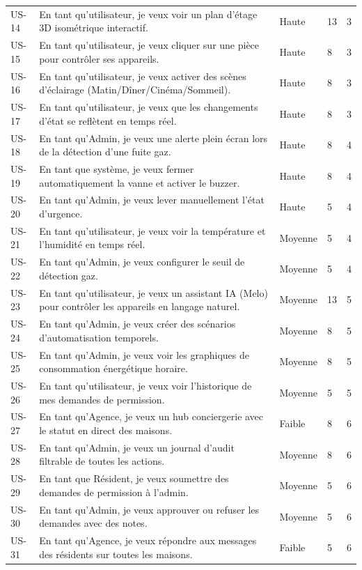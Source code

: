 \begin{center}
\begin{longtable}{p{} p{} p{} p{} p{}}
US-14 & En tant qu'utilisateur, je veux voir un plan d'étage 3D isométrique interactif. & Haute & 13 & 3 \\
US-15 & En tant qu'utilisateur, je veux cliquer sur une pièce pour contrôler ses appareils. & Haute & 8 & 3 \\
US-16 & En tant qu'utilisateur, je veux activer des scènes d'éclairage (Matin/Dîner/Cinéma/Sommeil). & Haute & 8 & 3 \\
US-17 & En tant qu'utilisateur, je veux que les changements d'état se reflètent en temps réel. & Haute & 8 & 3 \\
US-18 & En tant qu'Admin, je veux une alerte plein écran lors de la détection d'une fuite gaz. & Haute & 8 & 4 \\
US-19 & En tant que système, je veux fermer automatiquement la vanne et activer le buzzer. & Haute & 8 & 4 \\
US-20 & En tant qu'Admin, je veux lever manuellement l'état d'urgence. & Haute & 5 & 4 \\
US-21 & En tant qu'utilisateur, je veux voir la température et l'humidité en temps réel. & Moyenne & 5 & 4 \\
US-22 & En tant qu'Admin, je veux configurer le seuil de détection gaz. & Moyenne & 5 & 4 \\
US-23 & En tant qu'utilisateur, je veux un assistant IA (Melo) pour contrôler les appareils en langage naturel. & Moyenne & 13 & 5 \\
US-24 & En tant qu'Admin, je veux créer des scénarios d'automatisation temporels. & Moyenne & 8 & 5 \\
US-25 & En tant qu'Admin, je veux voir les graphiques de consommation énergétique horaire. & Moyenne & 8 & 5 \\
US-26 & En tant qu'utilisateur, je veux voir l'historique de mes demandes de permission. & Moyenne & 5 & 5 \\
US-27 & En tant qu'Agence, je veux un hub conciergerie avec le statut en direct des maisons. & Faible & 8 & 6 \\
US-28 & En tant qu'Admin, je veux un journal d'audit filtrable de toutes les actions. & Moyenne & 8 & 6 \\
US-29 & En tant que Résident, je veux soumettre des demandes de permission à l'admin. & Moyenne & 5 & 6 \\
US-30 & En tant qu'Admin, je veux approuver ou refuser les demandes avec des notes. & Moyenne & 5 & 6 \\
US-31 & En tant qu'Agence, je veux répondre aux messages des résidents sur toutes les maisons. & Faible & 5 & 6 \\

\end{longtable}
\end{center}
